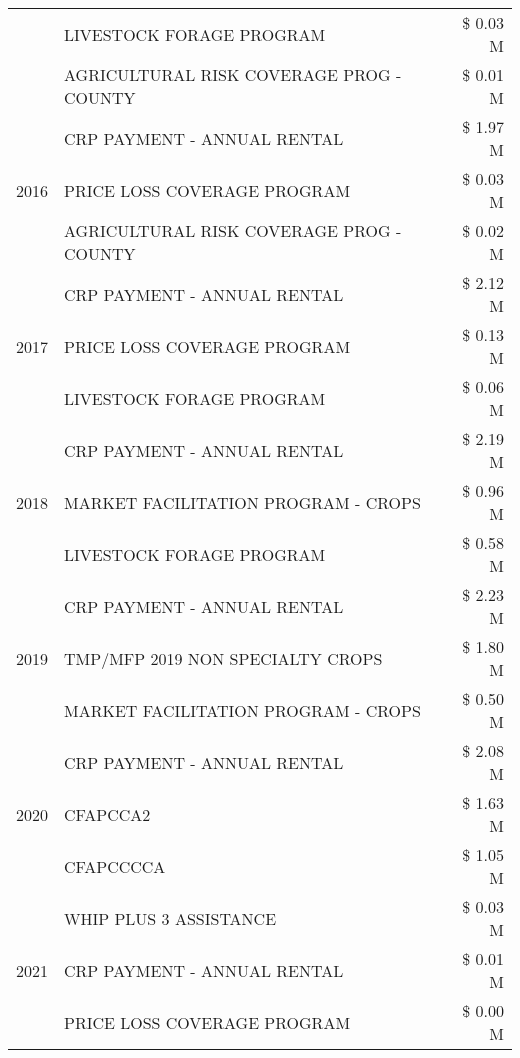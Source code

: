 \begin{tabular}{llr}
 & LIVESTOCK FORAGE PROGRAM & \$ 0.03 M \\
 & AGRICULTURAL RISK COVERAGE PROG - COUNTY & \$ 0.01 M \\
\cline{1-3}
\multirow[t]{3}{*}{2016} & CRP PAYMENT - ANNUAL RENTAL & \$ 1.97 M \\
 & PRICE LOSS COVERAGE PROGRAM & \$ 0.03 M \\
 & AGRICULTURAL RISK COVERAGE PROG - COUNTY & \$ 0.02 M \\
\cline{1-3}
\multirow[t]{3}{*}{2017} & CRP PAYMENT - ANNUAL RENTAL & \$ 2.12 M \\
 & PRICE LOSS COVERAGE PROGRAM & \$ 0.13 M \\
 & LIVESTOCK FORAGE PROGRAM & \$ 0.06 M \\
\cline{1-3}
\multirow[t]{3}{*}{2018} & CRP PAYMENT - ANNUAL RENTAL & \$ 2.19 M \\
 & MARKET FACILITATION PROGRAM - CROPS & \$ 0.96 M \\
 & LIVESTOCK FORAGE PROGRAM & \$ 0.58 M \\
\cline{1-3}
\multirow[t]{3}{*}{2019} & CRP PAYMENT - ANNUAL RENTAL & \$ 2.23 M \\
 & TMP/MFP 2019 NON SPECIALTY CROPS & \$ 1.80 M \\
 & MARKET FACILITATION PROGRAM - CROPS & \$ 0.50 M \\
\cline{1-3}
\multirow[t]{3}{*}{2020} & CRP PAYMENT - ANNUAL RENTAL & \$ 2.08 M \\
 & CFAPCCA2 & \$ 1.63 M \\
 & CFAPCCCCA & \$ 1.05 M \\
\cline{1-3}
\multirow[t]{3}{*}{2021} & WHIP PLUS 3 ASSISTANCE & \$ 0.03 M \\
 & CRP PAYMENT - ANNUAL RENTAL & \$ 0.01 M \\
 & PRICE LOSS COVERAGE PROGRAM & \$ 0.00 M \\
\cline{1-3}
\bottomrule
\end{tabular}
